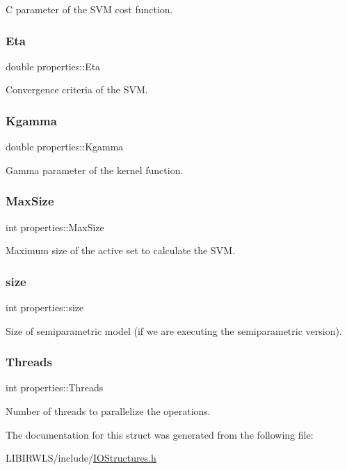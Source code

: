 C parameter of the S\+VM cost function. \hypertarget{structproperties_abd91deb543a31a6a1f75892af7cf95c8}{}\label{structproperties_abd91deb543a31a6a1f75892af7cf95c8} 
\subsubsection{\texorpdfstring{Eta}{Eta}}
{\ttfamily double properties\+::\+Eta}

Convergence criteria of the S\+VM. \hypertarget{structproperties_aab9c0195a446f08fc782701750ddb6ac}{}\label{structproperties_aab9c0195a446f08fc782701750ddb6ac} 
\subsubsection{\texorpdfstring{Kgamma}{Kgamma}}
{\ttfamily double properties\+::\+Kgamma}

Gamma parameter of the kernel function. \hypertarget{structproperties_a42219768dd35e1ab628e1785759df400}{}\label{structproperties_a42219768dd35e1ab628e1785759df400} 
\subsubsection{\texorpdfstring{Max\+Size}{MaxSize}}
{\ttfamily int properties\+::\+Max\+Size}

Maximum size of the active set to calculate the S\+VM. \hypertarget{structproperties_a1694aebbbdd904f9b0e5faca725966b6}{}\label{structproperties_a1694aebbbdd904f9b0e5faca725966b6} 
\subsubsection{\texorpdfstring{size}{size}}
{\ttfamily int properties\+::size}

Size of semiparametric model (if we are executing the semiparametric version). \hypertarget{structproperties_a56ab77c44fb808e71990074bd75529ed}{}\label{structproperties_a56ab77c44fb808e71990074bd75529ed} 
\subsubsection{\texorpdfstring{Threads}{Threads}}
{\ttfamily int properties\+::\+Threads}

Number of threads to parallelize the operations. 

The documentation for this struct was generated from the following file\+:\begin{DoxyCompactItemize}
\item 
L\+I\+B\+I\+R\+W\+L\+S/include/\hyperlink{IOStructures_8h}{I\+O\+Structures.\+h}\end{DoxyCompactItemize}
